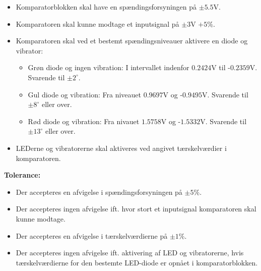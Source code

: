 \begin{itemize}
	\item Komparatorblokken skal have en spændingsforsyningen på $\pm5.5$V.
	\item Komparatoren skal kunne modtage et inputsignal på $\pm3$V $+5\%$.
	\item Komparatoren skal ved et bestemt spændingsniveauer aktivere en diode og vibrator:
	\begin{itemize}
		\item Grøn diode og ingen vibration: I intervallet indenfor $0.2424$V til -$0.2359$V. Svarende til $\pm2^{\circ}$.
		\item Gul diode og vibration: Fra niveauet $0.9697$V og -$0.9495$V. Svarende til $\pm 8^{\circ}$ eller over.
		\item Rød diode og vibration: Fra nivauet $1.5758$V og -$1.5332$V. Svarende til $\pm13^{\circ}$ eller over.
	\end{itemize}
	\item LEDerne og vibratorerne skal aktiveres ved angivet tærskelværdier i komparatoren.
\end{itemize}
\textbf{Tolerance:}
\begin{itemize}
	\item Der accepteres en afvigelse i spændingsforsyningen på $\pm5\%$.
	\item Der accepteres ingen afvigelse ift. hvor stort et inputsignal komparatoren skal kunne modtage.
	\item Der accepteres en afvigelse i tærskelværdierne på $\pm1\%$.
	\item Der accepteres ingen afvigelse ift. aktivering af LED og vibratorerne, hvis tærskelværdierne for den bestemte LED-diode er opnået i komparatorblokken.
\end{itemize}
